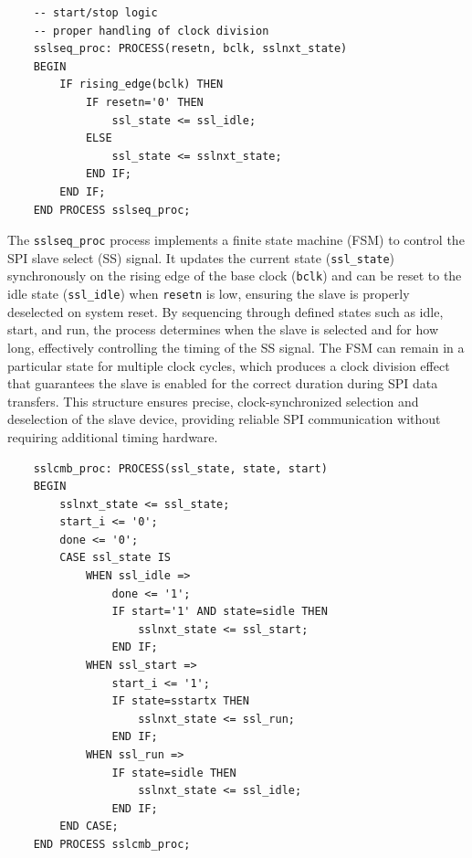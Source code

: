 \begin{verbatim}
	-- start/stop logic
	-- proper handling of clock division
	sslseq_proc: PROCESS(resetn, bclk, sslnxt_state)
	BEGIN
		IF rising_edge(bclk) THEN
			IF resetn='0' THEN
				ssl_state <= ssl_idle;
			ELSE
				ssl_state <= sslnxt_state;
			END IF;
		END IF;
	END PROCESS sslseq_proc;
\end{verbatim}

The \texttt{sslseq\_proc} process implements a finite state machine (FSM) to control the SPI slave select (SS) signal. It updates the current state (\texttt{ssl\_state}) synchronously on the rising edge of the base clock (\texttt{bclk}) and can be reset to the idle state (\texttt{ssl\_idle}) when \texttt{resetn} is low, ensuring the slave is properly deselected on system reset. By sequencing through defined states such as idle, start, and run, the process determines when the slave is selected and for how long, effectively controlling the timing of the SS signal. The FSM can remain in a particular state for multiple clock cycles, which produces a clock division effect that guarantees the slave is enabled for the correct duration during SPI data transfers. This structure ensures precise, clock-synchronized selection and deselection of the slave device, providing reliable SPI communication without requiring additional timing hardware.



\begin{verbatim}
	sslcmb_proc: PROCESS(ssl_state, state, start)
	BEGIN
		sslnxt_state <= ssl_state;
		start_i <= '0';
		done <= '0';
		CASE ssl_state IS
			WHEN ssl_idle =>
				done <= '1';
				IF start='1' AND state=sidle THEN
					sslnxt_state <= ssl_start;
				END IF;
			WHEN ssl_start =>
				start_i <= '1';
				IF state=sstartx THEN
					sslnxt_state <= ssl_run;
				END IF;
			WHEN ssl_run =>
				IF state=sidle THEN
					sslnxt_state <= ssl_idle;
				END IF;
		END CASE;
	END PROCESS sslcmb_proc;
\end{verbatim}

